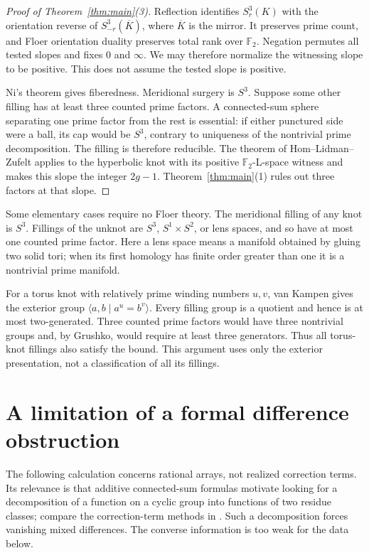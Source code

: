\documentclass[11pt]{article}
\theoremstyle{remark}
\newcommand{\F}{\mathbb F_2}
\begin{document}
\begin{proof}[Proof of Theorem~\ref{thm:main}(3)]
Reflection identifies $S^3_r(K)$ with the orientation reverse of $S^3_{-r}(\overline K)$, where $\overline K$ is the mirror. It preserves prime count, and Floer orientation duality preserves total rank over $\F$. Negation permutes all tested slopes and fixes $0$ and $\infty$. We may therefore normalize the witnessing slope to be positive. This does not assume the tested slope is positive.

Ni's theorem gives fiberedness. Meridional surgery is $S^3$. Suppose some other filling has at least three counted prime factors. A connected-sum sphere separating one prime factor from the rest is essential: if either punctured side were a ball, its cap would be $S^3$, contrary to uniqueness of the nontrivial prime decomposition. The filling is therefore reducible. The theorem of Hom--Lidman--Zufelt applies to the hyperbolic knot with its positive $\F$-L-space witness and makes this slope the integer $2g-1$. Theorem~\ref{thm:main}(1) rules out three factors at that slope.
\end{proof}

Some elementary cases require no Floer theory. The meridional filling of any knot is $S^3$. Fillings of the unknot are $S^3$, $S^1\times S^2$, or lens spaces, and so have at most one counted prime factor. Here a lens space means a manifold obtained by gluing two solid tori; when its first homology has finite order greater than one it is a nontrivial prime manifold.

For a torus knot with relatively prime winding numbers $u,v$, van Kampen gives the exterior group $\langle a,b\mid a^u=b^v\rangle$. Every filling group is a quotient and hence is at most two-generated. Three counted prime factors would have three nontrivial groups and, by Grushko, would require at least three generators. Thus all torus-knot fillings also satisfy the bound. This argument uses only the exterior presentation, not a classification of all its fillings.

\section{A limitation of a formal difference obstruction}\label{sec:formal}

The following calculation concerns rational arrays, not realized correction terms. Its relevance is that additive connected-sum formulas motivate looking for a decomposition of a function on a cyclic group into functions of two residue classes; compare the correction-term methods in \cite[Section~2.1]{BD}. Such a decomposition forces vanishing mixed differences. The converse information is too weak for the data below.
\end{document}
